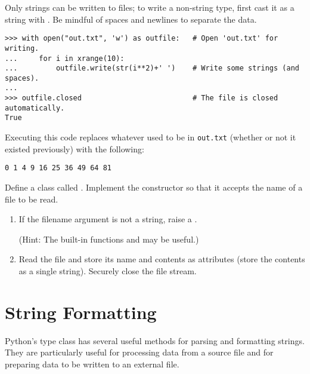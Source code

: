 Only strings can be written to files; to write a non-string type, first cast it as a string with .
Be mindful of spaces and newlines to separate the data.

\begin{lstlisting}
>>> with open("out.txt", 'w') as outfile:   # Open 'out.txt' for writing.
...     for i in xrange(10):
...         outfile.write(str(i**2)+' ')    # Write some strings (and spaces).
...
>>> outfile.closed                          # The file is closed automatically.
True
\end{lstlisting}

Executing this code replaces whatever used to be in \texttt{out.txt} (whether or not it existed previously) with the following:

\begin{lstlisting}
0 1 4 9 16 25 36 49 64 81
\end{lstlisting}

\begin{problem} %
Define a class called .
Implement the constructor so that it accepts the name of a file to be read.
%
\begin{enumerate}
\item If the filename argument is not a string, raise a .

(Hint: The built-in functions  and  may be useful.)

\item Read the file and store its name and contents as attributes
(store the contents as a single string).
Securely close the file stream.
\end{enumerate}
\end{problem}

\section*{String Formatting} %

Python's  type class has several useful methods for parsing and formatting strings.
They are particularly useful for processing data from a source file and for preparing data to be written to an external file.

